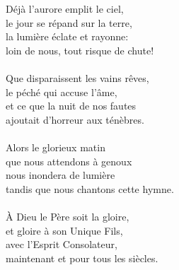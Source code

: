 Déjà l’aurore emplit le ciel,\\
le jour se répand sur la terre,\\
la lumière éclate et rayonne:\\
loin de nous, tout risque de chute!\\
\\
Que disparaissent les vains rêves,\\
le péché qui accuse l’âme,\\
et ce que la nuit de nos fautes\\
ajoutait d’horreur aux ténèbres.\\
\\
Alors le glorieux matin\\
que nous attendons à genoux\\
nous inondera de lumière\\
tandis que nous chantons cette hymne.\\
\\
À Dieu le Père soit la gloire,\\
et gloire à son Unique Fils,\\
avec l’Esprit Consolateur,\\
maintenant et pour tous les siècles.